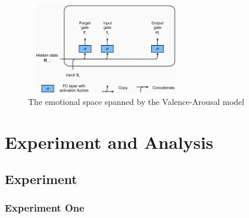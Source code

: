 \begin{figure}[htbp]
	\centering
	\includegraphics[height=4cm,width=7cm]{figures/lstm_en.eps}
	\caption{The emotional space spanned by the Valence-Arousal model}\label{fig:lstm}
\end{figure}



\section{Experiment and Analysis} \label{sec-experiment}

\subsection{Experiment}

\subsubsection{Experiment One}
\

